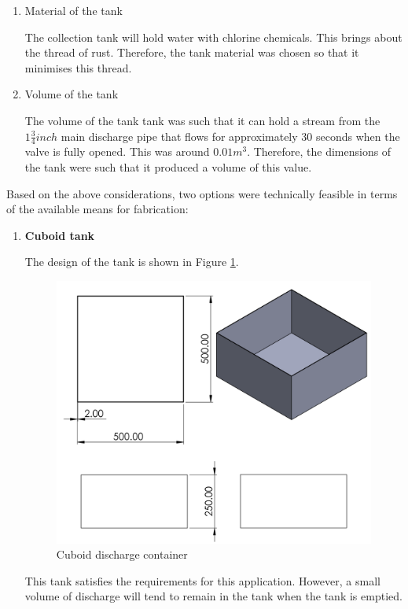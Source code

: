 \begin{itemize}
\begin{enumerate}
    \item Material of the tank
    \par
    The collection tank will hold water with chlorine chemicals. This brings about the thread of rust. Therefore, the tank material was chosen so that it minimises this thread. 
    \item Volume of the tank
    \par
    The volume of the tank tank was such that it can hold a stream from the $1 \frac{3}{4} inch$ main discharge pipe that flows for approximately 30 seconds when the valve is fully opened. This was around $0.01m^{3}$. Therefore, the dimensions of the tank were such that it produced a volume of this value.
\end{enumerate}
Based on the above considerations, two options were technically feasible in terms of the available means for fabrication:
\begin{enumerate}
    \item \textbf{Cuboid tank}
    \par
    The design of the tank is shown in Figure \ref{fig:cuboid_discharge_container}.
    \begin{figure}[H]
        \centering
        \includegraphics{Figures/DischargeContainer.PNG}
        \caption{Cuboid discharge container}
        \label{fig:cuboid_discharge_container}
    \end{figure}
    This tank satisfies the requirements for this application. However, a small volume of discharge will tend to remain in the tank when the tank is emptied.

\end{enumerate}
\end{itemize}
